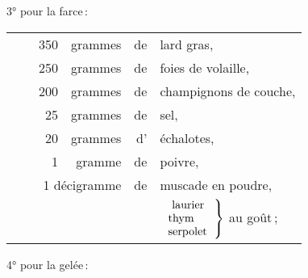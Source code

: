 3° pour la farce :

\footnotesize
\begin{longtable}{rrrrrp{18em}}
  & \hspace{2em} & 350 & grammes & de & lard gras,                                                        \\
  & \hspace{2em} & 250 & grammes & de & foies de volaille,                                                \\
  & \hspace{2em} & 200 & grammes & de & champignons de couche,                                            \\
  & \hspace{2em} &  25 & grammes & de & sel,                                                              \\
  & \hspace{2em} &  20 & grammes & d' & échalotes,                                                        \\
  & \hspace{2em} &   1 & gramme  & de & poivre,                                                           \\
  & \multicolumn{3}{r}{1 décigramme} & de & muscade en poudre,                                            \\
  & \hspace{2em} &     &         &    & $\left.
                            \begin{tabular}{l}
                            \setlength\tabcolsep{0pt}
                              laurier  \\
                              thym     \\
                              serpolet \\
                            \end{tabular}
                            \right\} $ au goût ;                                                         \\
\end{longtable}
\normalsize

4° pour la gelée :


